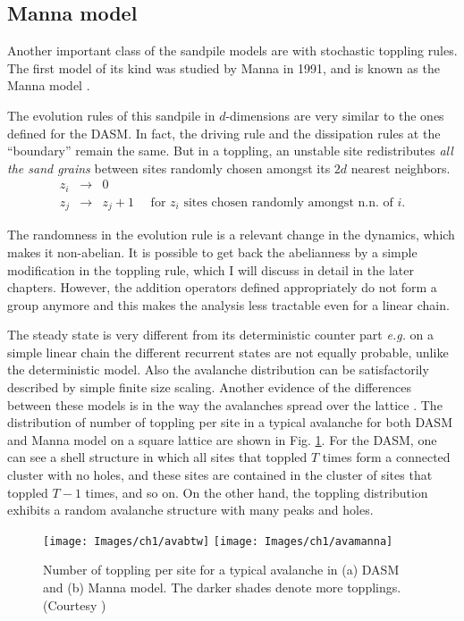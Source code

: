 \documentclass[11pt,a4paper]{book}
\begin{document}
\subsection{Manna model}
Another important class of the sandpile models are with stochastic
toppling rules. The first model of its kind was studied by Manna in
1991, and is known as the Manna model \cite{manna}.

The evolution rules of this sandpile in $d$-dimensions are very
similar to the ones defined for the DASM. In fact, the driving rule
and the dissipation rules at the ``boundary'' remain the same. But in a toppling, an
unstable site redistributes \textit{all the sand grains} between sites randomly
chosen amongst its $2d$ nearest neighbors.
\begin{eqnarray}
z_{i}&\rightarrow&0\nonumber\\
z_{j}&\rightarrow&z_{j}+1 \mbox{~ ~ for $z_{i}$ sites chosen
randomly amongst n.n. of $i$.}\nonumber
\end{eqnarray}

The randomness in the evolution rule is a relevant change in the
dynamics, which makes it non-abelian. It is possible to get back the
abelianness by a simple modification in the toppling rule, which I
will discuss in detail in the later chapters. However, the addition
operators defined appropriately do not form a group anymore and this
makes the analysis less tractable even for a linear chain.

The steady state is very different from its deterministic counter part
\textit{e.g.} on
a simple linear chain the different recurrent states are not equally
probable, unlike the deterministic model. Also the avalanche
distribution can be satisfactorily described by simple finite
size scaling.
Another evidence of the differences between these models is in the way
the avalanches spread over the lattice \cite{milshtein}. The
distribution of number of toppling per site in a typical avalanche for
both DASM and Manna model on a square lattice are shown in Fig. \ref{fig:ava}. For the
DASM, one can see a shell structure in which all sites that toppled
$T$ times form a connected cluster with no holes, and these sites are
contained in the cluster of sites that toppled $T-1$ times, and so on.
On the other hand, the toppling distribution exhibits a random
avalanche structure with many peaks and holes.
\begin{figure}
\begin{center}
\texttt{[image: Images/ch1/avabtw]}
\texttt{[image: Images/ch1/avamanna]}
\label{fig:ava}
\caption{Number of toppling per site for a typical avalanche in
(a) DASM
and (b) Manna model. The darker shades denote more topplings. (Courtesy
\cite{milshtein})}
\end{center}
\end{figure}
\end{document}
